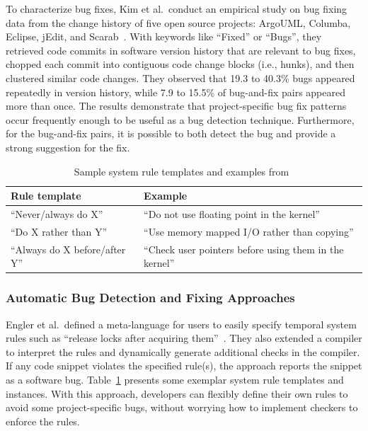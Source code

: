 \documentclass[runningheads,a4paper]{llncs}
\begin{document}
To characterize bug fixes, Kim et al.~conduct an empirical study on bug fixing data from the change history of five open source projects: ArgoUML, Columba, Eclipse, jEdit, and Scarab~\cite{Kim2006:MBF}. With keywords like ``Fixed'' or ``Bugs'', they retrieved code commits in software version history that are relevant to bug fixes, chopped each commit into contiguous code change blocks (i.e., hunks), and then clustered similar code changes. They observed that 19.3 to 40.3\% bugs appeared repeatedly in version history, while 7.9 to 15.5\% of bug-and-fix pairs appeared more than once. The results demonstrate that project-specific bug fix patterns occur frequently enough to be useful as a bug detection technique. Furthermore, for the bug-and-fix pairs, it is possible to both detect the bug and provide a strong suggestion for the fix. 

\begin{table}[]
\centering
\caption{Sample system rule templates and examples from~\cite{Engler2000:CSR}}
\label{tab:rule}
\begin{tabular}{l|l}
\toprule
Rule template                  & Example                                                 \\ \hline
``Never/always do X''          & ``Do not use floating point in the kernel''             \\\hline
``Do X rather than Y''         & ``Use memory mapped I/O rather than copying''           \\ \hline
``Always do X before/after Y'' & ``Check user pointers before using them in the kernel''\\
\bottomrule
\end{tabular}
\end{table} 

\subsubsection{Automatic Bug Detection and Fixing Approaches}
Engler et al.~defined a meta-language for users to easily specify temporal system rules such as ``release locks after acquiring them''~\cite{Engler2000:CSR}. They also extended a compiler to interpret the rules and dynamically generate additional checks in the compiler. If any code snippet violates the specified rule(s), the approach reports the snippet as a software bug. Table~\ref{tab:rule} presents some exemplar system rule templates and instances. 
With this approach, developers can flexibly define their own rules to avoid some project-specific bugs, without worrying how to implement checkers to enforce the rules.
\end{document}
